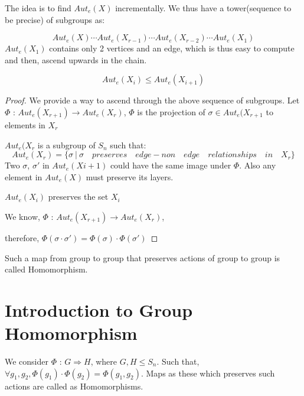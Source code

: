The idea is to find $Aut_e(X)$ incrementally.
We thus have a tower(sequence to be precise) of subgroups as:

 \[ Aut_e(X)\cdots Aut_e(X_{r-1})\cdots Aut_e(X_{r-2})\cdots Aut_e(X_{1})\]
 $Aut_e(X_{1})$ contains only 2 vertices and an edge, which is thus easy to compute and then, ascend upwards in the chain.
 
 \begin{observation} \[Aut_e(X_i) \leqslant Aut_e(X_{i+1})\]
 \end{observation}
 
 
 \begin{proof}
 We provide a way to ascend through the above sequence of subgroups. 
 Let $\Phi$ : $Aut_e(X_{r+1})\rightarrow Aut_e(X_{r})$,
 $\Phi$ is the projection of $\sigma \in Aut_e(X_{r+1}$ to elements in $X_{r}$
 
 $Aut_e(X_{r}$ is a subgroup of $S_n$ such that:
 \[ Aut_e(X_r)= \{\sigma ~|~ \sigma \quad preserves\quad edge-non\quad edge\quad relationships\quad in\quad X_r\}\]
 Two $\sigma$, $\sigma'$ in $Aut_e(X{i+1})$ could have the same image under $\Phi$.
 Also any element in $Aut_e(X)$ must preserve its layers.
 
 \begin{observation}
 $Aut_e(X_{i})$ preserves the set $X_{i}$
 \end{observation}
 
 We know, $\Phi$ : $Aut_e(X_{r+1})\rightarrow Aut_e(X_{r})$,
 
 
 therefore, $\Phi(\sigma\cdot\sigma')= \Phi(\sigma)\cdot\Phi(\sigma')$
 
 \end{proof}
 Such a map from group to group that preserves actions of group to group is called Homomorphism.
 
 \section{Introduction to Group Homomorphism}
 
 \begin{definition} We consider $\Phi$ : $G \Longrightarrow H$, where $G,H \leqslant S_n.$
 Such that, $\forall g_1,g_2, \Phi(g_1)\cdot\Phi(g_2)= \Phi(g_1,g_2).$
 Maps as these which preserves such actions are called as Homomorphisms.
 \end{definition}
 
